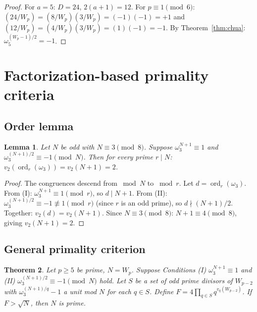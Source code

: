 \documentclass[12pt]{article}
\theoremstyle{plain}
\newtheorem{theorem}{Theorem}[section]
\newtheorem{lemma}[theorem]{Lemma}
\theoremstyle{definition}
\theoremstyle{remark}
\begin{document}
\begin{proof}
For \(a = 5\): \(D = 24\), \(2(a+1) = 12\). For
\(p \equiv 1 \pmod{6}\): \((24/W_p) = (8/W_p)(3/W_p) = (-1)(-1) = +1\)
and \((12/W_p) = (4/W_p)(3/W_p) = (1)(-1) = -1\). By Theorem~\ref{thm:chua}:
\(\omega_5^{(W_p - 1)/2} = -1\).\end{proof}




\section{Factorization-based primality criteria}


\subsection{Order lemma}


\begin{lemma}\label{lem:order}
Let \(N\) be odd with \(N \equiv 3 \pmod{8}\). Suppose
\(\omega_3^{N+1} \equiv 1\) and \(\omega_3^{(N+1)/2} \equiv -1 \pmod{N}\).
Then for every prime \(r \mid N\): \(v_2(\operatorname{ord}_r(\omega_3))
= v_2(N+1) = 2\).
\end{lemma}


\begin{proof}
The congruences descend from \(\bmod N\) to \(\bmod r\).
Let \(d = \operatorname{ord}_r(\omega_3)\). From (I):
\(\omega_3^{N+1} \equiv 1 \pmod{r}\), so \(d \mid N+1\). From (II):
\(\omega_3^{(N+1)/2} \equiv -1 \not\equiv 1 \pmod{r}\) (since
\(r\) is an odd prime), so \(d \nmid (N+1)/2\). Together:
\(v_2(d) = v_2(N+1)\). Since \(N \equiv 3 \pmod{8}\):
\(N + 1 \equiv 4 \pmod{8}\), giving \(v_2(N+1) = 2\).\end{proof}


\subsection{General primality criterion}


\begin{theorem}\label{thm:criterion}
Let \(p \geq 5\) be prime, \(N = W_p\). Suppose
Conditions (I) \(\omega_3^{N+1} \equiv 1\) and
(II) \(\omega_3^{(N+1)/2} \equiv -1 \pmod{N}\) hold. Let \(S\) be a
set of odd prime divisors of \(W_{p-2}\) with
\(\omega_3^{(N+1)/q} - 1\) a unit mod \(N\) for each \(q \in S\).
Define \(F = 4 \prod_{q \in S} q^{v_q(W_{p-2})}\). If \(F > \sqrt{N}\),
then \(N\) is prime.
\end{theorem}
\end{document}
